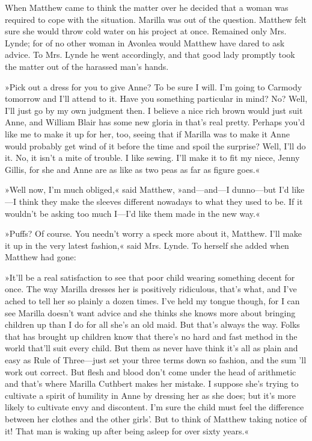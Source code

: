 When Matthew came to think the matter over he decided that a woman was required to cope with the situation. Marilla was out of the question. Matthew felt sure she would throw cold water on his project at once. Remained only Mrs. Lynde; for of no other woman in Avonlea would Matthew have dared to ask advice. To Mrs. Lynde he went accordingly, and that good lady promptly took the matter out of the harassed man’s hands.

»Pick out a dress for you to give Anne? To be sure I will. I’m going to Carmody tomorrow and I’ll attend to it. Have you something particular in mind? No? Well, I’ll just go by my own judgment then. I believe a nice rich brown would just suit Anne, and William Blair has some new gloria in that’s real pretty. Perhaps you’d like me to make it up for her, too, seeing that if Marilla was to make it Anne would probably get wind of it before the time and spoil the surprise? Well, I’ll do it. No, it isn’t a mite of trouble. I like sewing. I’ll make it to fit my niece, Jenny Gillis, for she and Anne are as like as two peas as far as figure goes.«

»Well now, I’m much obliged,« said Matthew, »and—and—I dunno—but I’d like—I think they make the sleeves different nowadays to what they used to be. If it wouldn’t be asking too much I—I’d like them made in the new way.«

»Puffs? Of course. You needn’t worry a speck more about it, Matthew. I’ll make it up in the very latest fashion,« said Mrs. Lynde. To herself she added when Matthew had gone:

»It’ll be a real satisfaction to see that poor child wearing something decent for once. The way Marilla dresses her is positively ridiculous, that’s what, and I’ve ached to tell her so plainly a dozen times. I’ve held my tongue though, for I can see Marilla doesn’t want advice and she thinks she knows more about bringing children up than I do for all she’s an old maid. But that’s always the way. Folks that has brought up children know that there’s no hard and fast method in the world that’ll suit every child. But them as never have think it’s all as plain and easy as Rule of Three—just set your three terms down so fashion, and the sum 'll work out correct. But flesh and blood don't come under the head of arithmetic and that’s where Marilla Cuthbert makes her mistake. I suppose she’s trying to cultivate a spirit of humility in Anne by dressing her as she does; but it’s more likely to cultivate envy and discontent. I’m sure the child must feel the difference between her clothes and the other girls’. But to think of Matthew taking notice of it! That man is waking up after being asleep for over sixty years.«

